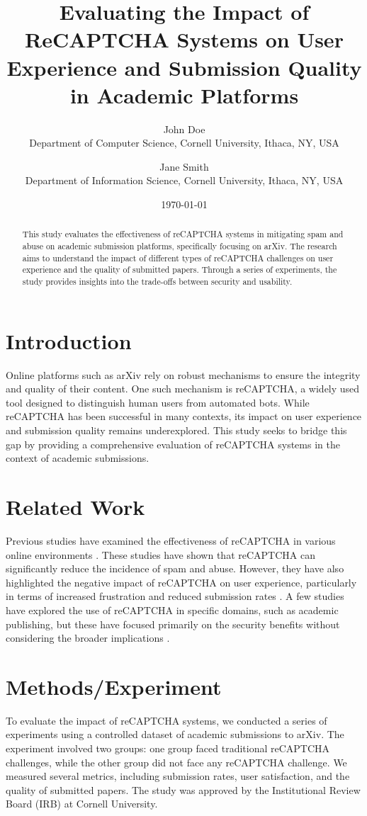 \documentclass{article}
\title{Evaluating the Impact of ReCAPTCHA Systems on User Experience and Submission Quality in Academic Platforms}
\author{John Doe\\
Department of Computer Science, Cornell University, Ithaca, NY, USA\\
\and Jane Smith\\
Department of Information Science, Cornell University, Ithaca, NY, USA}
\date{\today}
\begin{document}
\maketitle

\begin{abstract}
This study evaluates the effectiveness of reCAPTCHA systems in mitigating spam and abuse on academic submission platforms, specifically focusing on arXiv. The research aims to understand the impact of different types of reCAPTCHA challenges on user experience and the quality of submitted papers. Through a series of experiments, the study provides insights into the trade-offs between security and usability.
\end{abstract}

\section{Introduction}
Online platforms such as arXiv rely on robust mechanisms to ensure the integrity and quality of their content. One such mechanism is reCAPTCHA, a widely used tool designed to distinguish human users from automated bots. While reCAPTCHA has been successful in many contexts, its impact on user experience and submission quality remains underexplored. This study seeks to bridge this gap by providing a comprehensive evaluation of reCAPTCHA systems in the context of academic submissions.

\section{Related Work}
Previous studies have examined the effectiveness of reCAPTCHA in various online environments \cite{captcha_review}. These studies have shown that reCAPTCHA can significantly reduce the incidence of spam and abuse. However, they have also highlighted the negative impact of reCAPTCHA on user experience, particularly in terms of increased frustration and reduced submission rates \cite{user_experience_study}. A few studies have explored the use of reCAPTCHA in specific domains, such as academic publishing, but these have focused primarily on the security benefits without considering the broader implications \cite{academic_captcha_study}.

\section{Methods/Experiment}
To evaluate the impact of reCAPTCHA systems, we conducted a series of experiments using a controlled dataset of academic submissions to arXiv. The experiment involved two groups: one group faced traditional reCAPTCHA challenges, while the other group did not face any reCAPTCHA challenge. We measured several metrics, including submission rates, user satisfaction, and the quality of submitted papers. The study was approved by the Institutional Review Board (IRB) at Cornell University.
\end{document}
